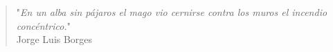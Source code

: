 \vspace*{\fill}
\begin{center}
\begin{quote}
\begin{flushright}
  "\textit{En un alba sin pájaros el mago vio cernirse contra los muros el incendio concéntrico.}" \\
  Jorge Luis Borges
\end{flushright}
\end{quote}
\end{center}
\vspace*{\fill}